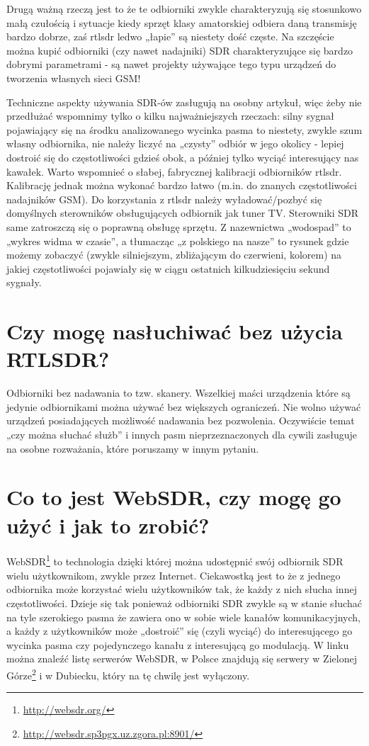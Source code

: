 \documentclass[a4paper,12pt]{article}
\begin{document}
Drugą ważną rzeczą jest to że te odbiorniki zwykle charakteryzują się stosunkowo małą czułością i sytuacje kiedy sprzęt klasy amatorskiej odbiera daną transmisję bardzo dobrze, zaś rtlsdr ledwo „łapie” są niestety dość częste. Na szczęście można kupić odbiorniki (czy nawet nadajniki) SDR charakteryzujące się bardzo dobrymi parametrami - są nawet projekty używające tego typu urządzeń do tworzenia własnych sieci GSM!

Techniczne aspekty używania SDR-ów zasługują na osobny artykuł, więc żeby nie przedłużać wspomnimy tylko o kilku najważniejszych rzeczach: silny sygnał pojawiający się na środku analizowanego wycinka pasma to niestety, zwykle szum własny odbiornika, nie należy liczyć na „czysty” odbiór w jego okolicy - lepiej dostroić się do częstotliwości gdzieś obok, a później tylko wyciąć interesujący nas kawałek. Warto wspomnieć o słabej, fabrycznej kalibracji odbiorników rtlsdr. Kalibrację jednak można wykonać bardzo łatwo (m.in. do znanych częstotliwości nadajników GSM). Do korzystania z rtlsdr należy wyładować/pozbyć się domyślnych sterowników obsługujących odbiornik jak tuner TV. Sterowniki SDR same zatroszczą się o poprawną obsługę sprzętu.
Z nazewnictwa „wodospad” to „wykres widma w czasie”, a tłumacząc „z polskiego na nasze” to rysunek gdzie możemy zobaczyć (zwykle silniejszym, zbliżającym do czerwieni, kolorem) na jakiej częstotliwości pojawiały się w ciągu ostatnich kilkudziesięciu sekund sygnały.

\section{Czy mogę nasłuchiwać bez użycia RTLSDR?}
Odbiorniki bez nadawania to tzw. skanery. Wszelkiej maści urządzenia które są jedynie odbiornikami można używać bez większych ograniczeń. Nie wolno używać urządzeń posiadających możliwość nadawania bez pozwolenia. Oczywiście temat „czy można słuchać służb” i innych pasm nieprzeznaczonych dla cywili zasługuje na osobne rozważania, które poruszamy w innym pytaniu.

\section{Co to jest WebSDR, czy mogę go użyć i jak to zrobić?}
WebSDR\footnote{\url{http://websdr.org/}} to technologia dzięki której można udostępnić swój odbiornik SDR wielu użytkownikom, zwykle przez Internet. Ciekawostką jest to że z jednego odbiornika może korzystać wielu użytkowników tak, że każdy z nich słucha innej częstotliwości. Dzieje się tak ponieważ odbiorniki SDR zwykle są w stanie słuchać na tyle szerokiego pasma że zawiera ono w sobie wiele kanałów komunikacyjnych, a każdy z użytkowników może „dostroić” się (czyli wyciąć) do interesującego go wycinka pasma czy pojedynczego kanału z interesującą go modulacją. W linku można znaleźć listę serwerów WebSDR, w Polsce znajdują się serwery w Zielonej Górze\footnote{\url{http://websdr.sp3pgx.uz.zgora.pl:8901/}} i w Dubiecku, który na tę chwilę jest wyłączony.
\end{document}
